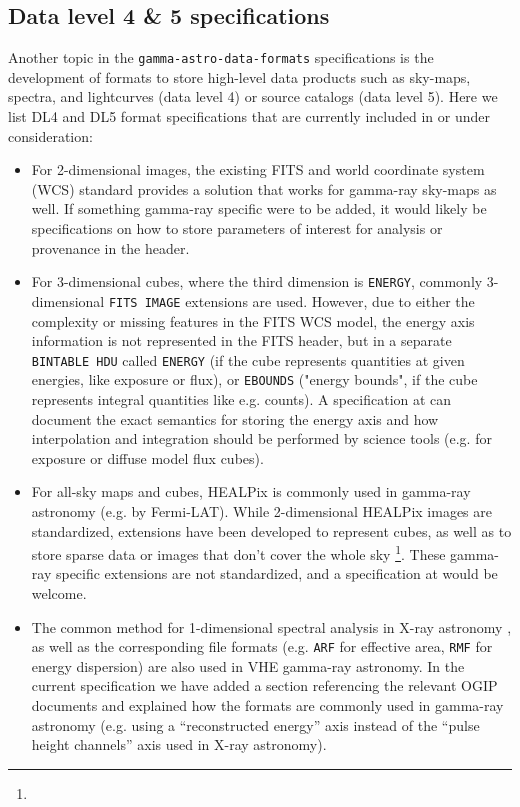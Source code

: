 \subsection{Data level 4 \& 5 specifications}

Another topic in the \texttt{gamma-astro-data-formats} specifications is the development of formats to store high-level data products such as sky-maps, spectra, and lightcurves (data level 4) or source catalogs (data level 5).  Here we list DL4 and DL5 format specifications that are currently included in \gadf or under consideration:
%
\begin{itemize}
\item{} For 2-dimensional images, the existing FITS and world coordinate system (WCS) standard provides a solution that works for gamma-ray sky-maps as well. If something gamma-ray specific were to be added, it would likely be specifications on how to store parameters of interest for analysis or provenance in the header.
\item{} For 3-dimensional cubes, where the third dimension is \texttt{ENERGY}, commonly 3-dimensional \texttt{FITS IMAGE} extensions are used. However, due to either the complexity or missing features in the FITS WCS model, the energy axis information is not represented in the FITS header, but in a separate \texttt{BINTABLE HDU} called \texttt{ENERGY} (if the cube represents quantities at given energies, like exposure or flux), or \texttt{EBOUNDS} ("energy bounds", if the cube represents integral quantities like e.g. counts).
A specification at \gadf can document the exact semantics for storing the energy axis and how interpolation and integration should be performed by science tools (e.g. for exposure or diffuse model flux cubes).
\item{} For all-sky maps and cubes, HEALPix\cite{2005ApJ...622..759G} is commonly used in gamma-ray astronomy (e.g. by Fermi-LAT). While 2-dimensional HEALPix images are standardized, extensions have been developed to represent cubes, as well as to store sparse data or images that don't cover the whole sky \footnote{\pointlikedata}. These gamma-ray specific extensions are not standardized, and a specification at \gadf would be welcome.
\item{} The common method for 1-dimensional spectral analysis in X-ray astronomy \citep{Davis:2001}, as well as the corresponding file formats (e.g. \texttt{ARF} for effective area, \texttt{RMF} for energy dispersion) are also used in VHE gamma-ray astronomy. In the current specification we have added a section referencing the relevant OGIP documents and explained how the formats are commonly used in gamma-ray astronomy (e.g. using a ``reconstructed energy'' axis instead of the ``pulse height channels'' axis used in X-ray astronomy).

\end{itemize}
